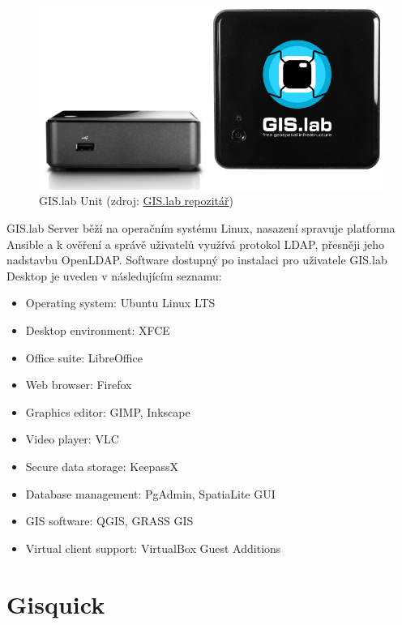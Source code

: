 \begin{figure}[H] \centering
    \includegraphics[width=350pt]{./pictures/gislab-unit.png}
    \caption[GIS.lab Unit]{GIS.lab Unit (zdroj:
	\href{https://github.com/gislab-npo/gislab-doc/blob/master/img/general/gislab-unit.svg}{GIS.lab repozitář})}
    \label{fig:gislab-unit}
\end{figure}

GIS.lab Server běží na operačním systému Linux, nasazení spravuje
platforma Ansible a k ověření a správě uživatelů využívá protokol
LDAP, přesněji jeho nadstavbu OpenLDAP. Software dostupný po instalaci
pro uživatele GIS.lab Desktop je uveden v následujícím seznamu:
\begin{itemize}
\item Operating system: Ubuntu Linux LTS
\item Desktop environment: XFCE
\item Office suite: LibreOffice
\item Web browser: Firefox
\item Graphics editor: GIMP, Inkscape
\item Video player: VLC
\item Secure data storage: KeepassX
\item Database management: PgAdmin, SpatiaLite GUI
\item GIS software: QGIS, GRASS GIS
\item Virtual client support: VirtualBox Guest Additions
\end{itemize}

\section{Gisquick}
\label{gisquick}

